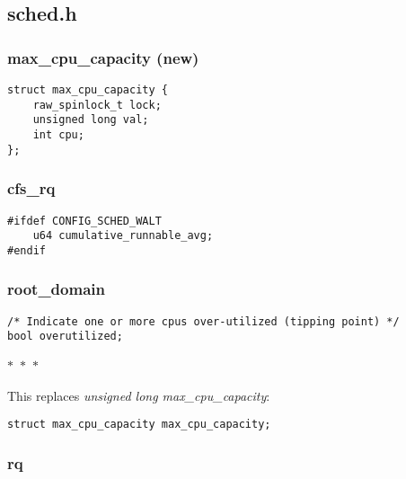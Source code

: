 \documentclass{article}
\newcommand{\divider}{{\begin{center}
  $\ast$~$\ast$~$\ast$
\end{center}}}
\begin{document}
\subsection{sched.h}

\subsubsection{max\_cpu\_capacity (new)}

\begin{verbatim}
struct max_cpu_capacity {
    raw_spinlock_t lock;
    unsigned long val;
    int cpu;
};
\end{verbatim}

\subsubsection{cfs\_rq}

\begin{verbatim}
#ifdef CONFIG_SCHED_WALT
    u64 cumulative_runnable_avg;
#endif
\end{verbatim}

\subsubsection{root\_domain}

\begin{verbatim}
/* Indicate one or more cpus over-utilized (tipping point) */
bool overutilized;
\end{verbatim}
\divider
This replaces \textit{unsigned long max\_cpu\_capacity}:
\begin{verbatim}
struct max_cpu_capacity max_cpu_capacity;
\end{verbatim}

\subsubsection{rq}
\end{document}
